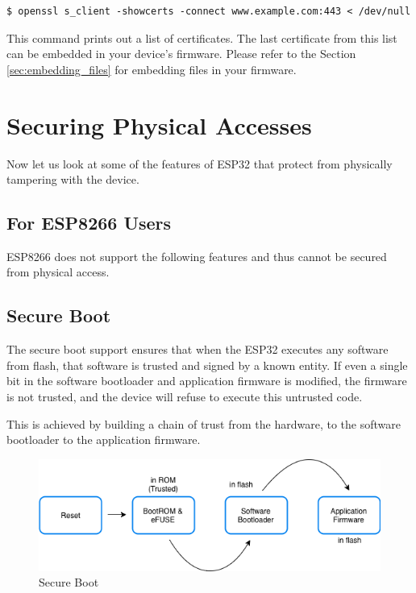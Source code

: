 \documentclass[main.tex]{subfiles}
\begin{document}
\begin{verbatim}
$ openssl s_client -showcerts -connect www.example.com:443 < /dev/null
\end{verbatim}

This command prints out a list of certificates. The last certificate from this list can be embedded in your device's firmware. Please refer to the Section \ref{sec:embedding_files} for embedding files in your firmware.

\section{Securing Physical Accesses}
Now let us look at some of the features of ESP32 that protect from physically tampering with the device.

\subsection{For ESP8266 Users}\label{sec:for_esp8266_users}
ESP8266 does not support the following features and thus cannot be secured from physical access.

\subsection{Secure Boot}
The secure boot support ensures that when the ESP32 executes any software from flash, that software is trusted and signed by a known entity. If even a single bit in the software bootloader and application firmware is modified, the firmware is not trusted, and the device will refuse to execute this untrusted code.

This is achieved by building a chain of trust from the hardware, to the software bootloader to the application firmware.

\begin{figure}[h!]
    \centering
    \includegraphics[scale=0.5]{../../_static/secure_boot.png}
    \caption{Secure Boot}
    \label{fig:sec_boot}
\end{figure}
\end{document}
